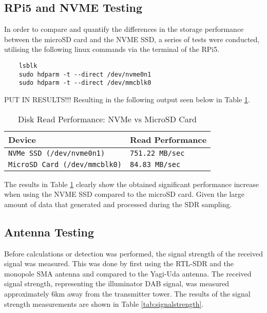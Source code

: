 \subsection{RPi5 and NVME Testing \label{sec:sbcVerification}}
In order to compare and quantify the differences in the storage performance between the microSD card and the NVME SSD, a series of tests were conducted, utilising the following linux commands via the terminal of the RPi5.

\begin{verbatim}
    lsblk
    sudo hdparm -t --direct /dev/nvme0n1 
    sudo hdparm -t --direct /dev/mmcblk0
\end{verbatim}
PUT IN RESULTS!!!
\noindent Resulting in the following output seen below in Table \ref{tab:diskperf}.

\begin{table}[h!]
    \centering
    \caption{Disk Read Performance: NVMe vs MicroSD Card \label{tab:diskperf}}
    \begin{tabular}{|l|l|}
    \hline
    \textbf{Device} & \textbf{Read Performance} \\ \hline
    \texttt{NVMe SSD (\texttt{/dev/nvme0n1})} & \texttt{751.22 MB/sec} \\ \hline
    \texttt{MicroSD Card (\texttt{/dev/mmcblk0})} & \texttt{84.83 MB/sec} \\ \hline
    \end{tabular}
\end{table}

The results in Table \ref{tab:diskperf} clearly show the obtained significant performance increase when using the NVME SSD compared to the microSD card. Given the large amount of data that generated and processed during the SDR sampling. 

\subsection{Antenna Testing \label{sec:antennaVerification}}


Before calculations or detection was performed, the signal strength of the received signal was measured. This was done by first using the RTL-SDR and the monopole SMA antenna and compared to the Yagi-Uda antenna. The received signal strength, representing the illuminator DAB signal, was measured approximately 6km away from the transmitter tower.  The results of the signal strength measurements are shown in Table \ref{tab:signalstrength}.


